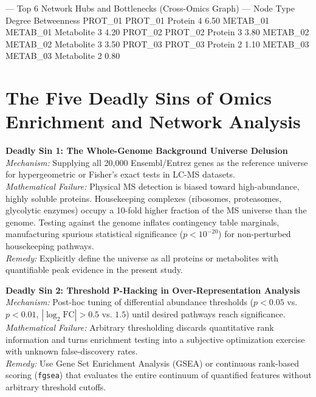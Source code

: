 \documentclass[11pt,twoside,openright]{book}
\begin{document}
\begin{routput}
--- Top 6 Network Hubs and Bottlenecks (Cross-Omics Graph) ---
             Node       Type Degree Betweenness
PROT\_01   PROT\_01    Protein      4        6.50
METAB\_01 METAB\_01 Metabolite      3        4.20
PROT\_02   PROT\_02    Protein      3        3.80
METAB\_02 METAB\_02 Metabolite      3        3.50
PROT\_03   PROT\_03    Protein      2        1.10
METAB\_03 METAB\_03 Metabolite      2        0.80
\end{routput}

\section{The Five Deadly Sins of Omics Enrichment and Network Analysis}

\begin{pitfallbox}
\textbf{Deadly Sin 1: The Whole-Genome Background Universe Delusion}\\
\textit{Mechanism:} Supplying all 20,000 Ensembl/Entrez genes as the reference universe for hypergeometric or Fisher's exact tests in LC-MS datasets.\\
\textit{Mathematical Failure:} Physical MS detection is biased toward high-abundance, highly soluble proteins. Housekeeping complexes (ribosomes, proteasomes, glycolytic enzymes) occupy a 10-fold higher fraction of the MS universe than the genome. Testing against the genome inflates contingency table marginals, manufacturing spurious statistical significance ($p < 10^{-20}$) for non-perturbed housekeeping pathways.\\
\textit{Remedy:} Explicitly define the universe as all proteins or metabolites with quantifiable peak evidence in the present study.
\end{pitfallbox}

\begin{pitfallbox}
\textbf{Deadly Sin 2: Threshold P-Hacking in Over-Representation Analysis}\\
\textit{Mechanism:} Post-hoc tuning of differential abundance thresholds ($p < 0.05$ vs. $p < 0.01$, $|\log_2 \text{FC}| > 0.5$ vs. $1.5$) until desired pathways reach significance.\\
\textit{Mathematical Failure:} Arbitrary thresholding discards quantitative rank information and turns enrichment testing into a subjective optimization exercise with unknown false-discovery rates.\\
\textit{Remedy:} Use Gene Set Enrichment Analysis (GSEA) or continuous rank-based scoring (\texttt{fgsea}) that evaluates the entire continuum of quantified features without arbitrary threshold cutoffs.
\end{pitfallbox}
\end{document}
